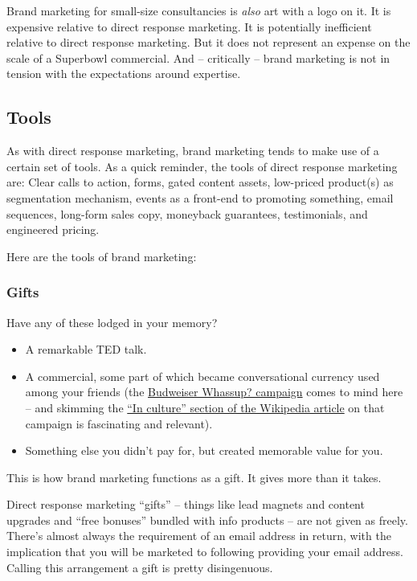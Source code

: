 \documentclass[13pt,]{tufte-handout}
\providecommand{\tightlist}{%
  \setlength{\itemsep}{0pt}\setlength{\parskip}{0pt}}
\begin{document}
Brand marketing for small-size consultancies is \emph{also} art with a
logo on it. It is expensive relative to direct response marketing. It is
potentially inefficient relative to direct response marketing. But it
does not represent an expense on the scale of a Superbowl commercial.
And -- critically -- brand marketing is not in tension with the
expectations around expertise.

\hypertarget{tools}{%
\subsection{Tools}\label{tools}}

As with direct response marketing, brand marketing tends to make use of
a certain set of tools. As a quick reminder, the tools of direct
response marketing are: Clear calls to action, forms, gated content
assets, low-priced product(s) as segmentation mechanism, events as a
front-end to promoting something, email sequences, long-form sales copy,
moneyback guarantees, testimonials, and engineered pricing.

Here are the tools of brand marketing:

\hypertarget{gifts}{%
\subsubsection{Gifts}\label{gifts}}

Have any of these lodged in your memory?

\begin{itemize}
\tightlist
\item
  A remarkable TED talk.
\item
  A commercial, some part of which became conversational currency used
  among your friends (the \href{https://youtu.be/JJmqCKtJnxM}{Budweiser
  Whassup? campaign} comes to mind here -- and skimming the
  \href{https://en.wikipedia.org/wiki/Whassup\%3F}{``In culture''
  section of the Wikipedia article} on that campaign is fascinating and
  relevant).
\item
  Something else you didn't pay for, but created memorable value for
  you.
\end{itemize}

This is how brand marketing functions as a gift. It gives more than it
takes.

Direct response marketing ``gifts'' -- things like lead magnets and
content upgrades and ``free bonuses'' bundled with info products -- are
not given as freely. There's almost always the requirement of an email
address in return, with the implication that you will be marketed to
following providing your email address. Calling this arrangement a gift
is pretty disingenuous.
\end{document}

